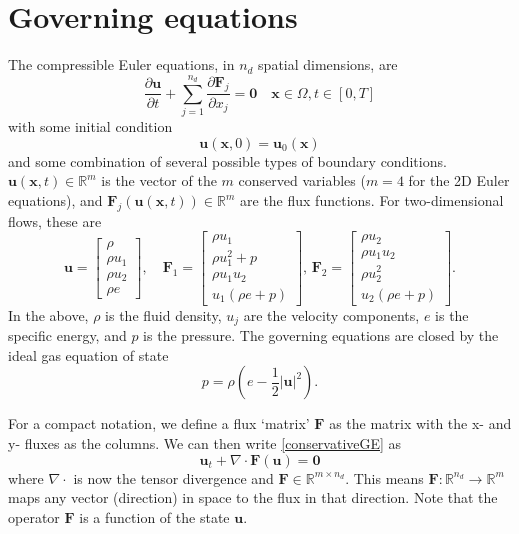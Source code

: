 \documentclass[11pt]{article}
\let\bld\boldsymbol
\begin{document}
\section{Governing equations}

The compressible Euler equations, in $n_d$ spatial dimensions, are
\begin{equation}
\frac{\partial \bld{u}}{\partial t} + \sum_{j=1}^{n_d} \frac{\partial \bld{F}_j}{\partial x_j} = \bld{0} \quad \bld{x} \in \Omega, t \in [0,T]
\label{conservativeGE}
\end{equation}
with some initial condition
\begin{equation}
\bld{u}(\bld{x},0) = \bld{u}_0(\bld{x})
\end{equation}
and some combination of several possible types of boundary conditions.
$\bld{u}(\bld{x},t) \in \mathbb{R}^m$ is the vector of the $m$ conserved variables ($m=4$ for the 2D Euler equations), and $\bld{F}_j(\bld{u}(\bld{x},t)) \in \mathbb{R}^m$ are the flux functions. For two-dimensional flows, these are
\begin{equation}
\bld{u} = 
\begin{bmatrix}
\rho \\ \rho u_1 \\ \rho u_2 \\ \rho e
\end{bmatrix}, \quad
\bld{F}_1 = 
\begin{bmatrix}
\rho u_1 \\ \rho u_1^2 + p \\ \rho u_1 u_2 \\ u_1 (\rho e + p)
\end{bmatrix}, \,
\bld{F}_2 = 
\begin{bmatrix}
\rho u_2 \\ \rho u_1 u_2 \\ \rho u_2^2 \\ u_2 (\rho e + p)
\end{bmatrix}.
\end{equation}
In the above, $\rho$ is the fluid density, $u_j$ are the velocity components, $e$ is the specific energy, and $p$ is the pressure. The governing equations are closed by the ideal gas equation of state
\begin{equation}
p = \rho (e - \frac12 \vert \bld{u} \vert^2).
\end{equation}

For a compact notation, we define a flux `matrix' $\bld{F}$ as the matrix with the x- and y- fluxes as the columns. We can then write \eqref{conservativeGE} as
\begin{equation}
\bld{u}_t + \nabla\cdot\bld{F}(\bld{u}) = \bld{0}
\label{conservativetensorGE}
\end{equation}
where $\nabla\cdot$ is now the tensor divergence and $\bld{F} \in \mathbb{R}^{m\times n_d}$. This means $\bld{F}:\mathbb{R}^{n_d}\rightarrow \mathbb{R}^m$ maps any vector (direction) in space to the flux in that direction. Note that the operator $\bld{F}$ is a function of the state $\bld{u}$.
\end{document}
